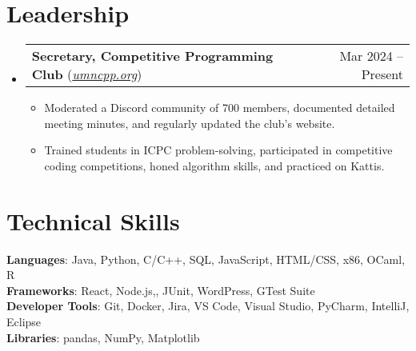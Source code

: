 \documentclass[letterpaper,11pt]{article}
\makeatletter
\newcommand{\resumeItem}[1]{
  \item\small{
    {#1 \vspace{-2pt}}
  }
}
\newcommand{\resumeProjectHeading}[2]{
    \item
    \begin{tabular*}{0.97\textwidth}{l@{\extracolsep{\fill}}r}
      \small#1 & #2 \\
    \end{tabular*}\vspace{-7pt}
}
\newcommand{\resumeSubHeadingListStart}{\begin{itemize}[leftmargin=0.15in, label={}]}
\newcommand{\resumeSubHeadingListEnd}{\end{itemize}}
\newcommand{\resumeItemListStart}{\begin{itemize}}
\newcommand{\resumeItemListEnd}{\end{itemize}\vspace{-5pt}}
\makeatother
\begin{document}
\section{Leadership}
\resumeSubHeadingListStart
      \resumeProjectHeading
          {\textbf{Secretary, Competitive Programming Club} (\href{https://cpp.umn.edu}{\textit{umncpp.org}})} {Mar 2024 -- Present}
          \resumeItemListStart
            \resumeItem{Moderated a Discord community of 700 members, documented detailed meeting minutes, and regularly updated the club’s website.}
            \resumeItem{Trained students in ICPC problem-solving, participated in competitive coding competitions, honed algorithm skills, and practiced on Kattis.}
          \resumeItemListEnd
    \resumeSubHeadingListEnd
%
\section{Technical Skills}
 \begin{itemize}[leftmargin=0.15in, label={}]
    \small{\item{
     \textbf{Languages}{: Java, Python, C/C++, SQL, JavaScript, HTML/CSS, x86, OCaml, R} \\
     \textbf{Frameworks}{: React, Node.js,, JUnit, WordPress, GTest Suite} \\
     \textbf{Developer Tools}{: Git, Docker, Jira,  VS Code, Visual Studio, PyCharm, IntelliJ, Eclipse} \\
     \textbf{Libraries}{: pandas, NumPy, Matplotlib}
    }}
 \end{itemize}


\end{document}
